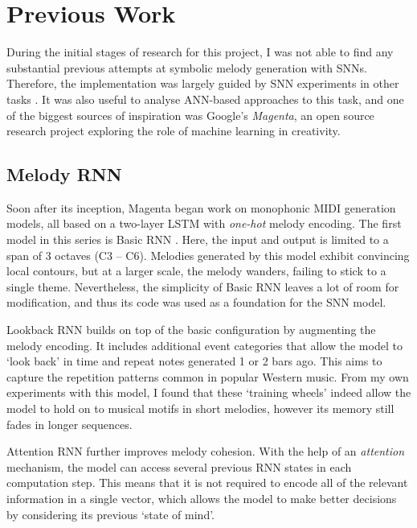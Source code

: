 \documentclass[../../report.tex]{subfiles}
\begin{document}
\section{Previous Work}

During the initial stages of research for this project, I was not able to find
any substantial previous attempts at symbolic melody generation with SNNs.
Therefore, the implementation was largely guided by SNN experiments in other
tasks \cite{Bellec2020, Bellec2018LSNN}. It was also useful to analyse ANN-based
approaches to this task, and one of the biggest sources of inspiration was
Google's \emph{Magenta}, an open source research project exploring the role of
machine learning in creativity.

\subsection{Melody RNN}

Soon after its inception, Magenta began work on monophonic MIDI generation
models, all based on a two-layer LSTM with \emph{one-hot}\footnotemark{} melody
encoding. The first model in this series is Basic RNN \cite{Abolafia2016}. Here,
the input and output is limited to a span of 3 octaves (C3 -- C6). Melodies
generated by this model exhibit convincing local contours, but at a larger
scale, the melody wanders, failing to stick to a single theme. Nevertheless, the
simplicity of Basic RNN leaves a lot of room for modification, and thus its code
was used as a foundation for the SNN model.


Lookback RNN \cite{Waite2016} builds on top of the basic configuration by
augmenting the melody encoding. It includes additional event categories that
allow the model to `look back' in time and repeat notes generated 1 or 2 bars
ago. This aims to capture the repetition patterns common in popular Western
music. From my own experiments with this model, I found that these `training
wheels' indeed allow the model to hold on to musical motifs in short melodies,
however its memory still fades in longer sequences.

Attention RNN \cite{Waite2016} further improves melody cohesion. With the help
of an \emph{attention} mechanism, the model can access several previous RNN
states in each computation step. This means that it is not required to encode
all of the relevant information in a single vector, which allows the model to
make better decisions by considering its previous `state of mind'.
\end{document}

